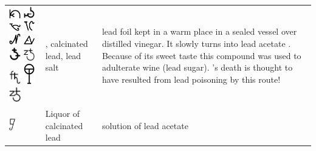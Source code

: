 \documentclass[british,final,landscape]{scrartcl}
\begin{document}
\begin{refsection}
\begin{supertabular}{p{0.3\textwidth}p{0.34\textwidth}p{0.34\textwidth}}
   \includegraphics[width=5mm]{Compounds/CalcinatedLead} \includegraphics[width=5mm]{Compounds/CalcinatedLead2} \includegraphics[width=5mm]{Compounds/CalcinatedLead3} \includegraphics[width=5mm]{Compounds/CalcinatedLead4} \includegraphics[width=5mm]{Compounds/CalcinatedLead5} \includegraphics[width=5mm]{Compounds/CalcinatedLead6} \includegraphics[width=5mm]{Compounds/CalcinatedLead7} \includegraphics[width=5mm]{Compounds/CalcinatedLead8} \includegraphics[width=5mm]{Compounds/CalcinatedLead9} \includegraphics[width=5mm]{Compounds/CalcinatedLead10} \includegraphics[width=5mm]{Compounds/LeadAcetate} & , calcinated lead, lead salt & lead foil kept in a warm place in a sealed vessel over distilled vinegar. It slowly turns into lead acetate . Because of its sweet taste this compound was used to adulterate wine (lead sugar). 's death is thought to have resulted from lead poisoning by this route!  \\
   \includegraphics[height=5mm]{Compounds/LeadAcetateSoln} & Liquor of calcinated lead & solution of lead acetate \\

\end{supertabular}
\end{refsection}
\end{document}
